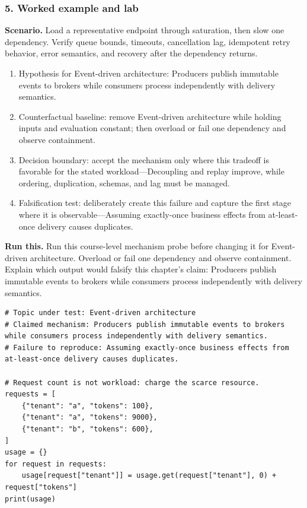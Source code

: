 \subsubsection*{5. Worked example and lab}
\textbf{Scenario.} Load a representative endpoint through saturation, then slow one dependency. Verify queue bounds, timeouts, cancellation lag, idempotent retry behavior, error semantics, and recovery after the dependency returns.
\begin{enumerate}
\item Hypothesis for Event-driven architecture: Producers publish immutable events to brokers while consumers process independently with delivery semantics.
\item Counterfactual baseline: remove Event-driven architecture while holding inputs and evaluation constant; then overload or fail one dependency and observe containment.
\item Decision boundary: accept the mechanism only where this tradeoff is favorable for the stated workload—Decoupling and replay improve, while ordering, duplication, schemas, and lag must be managed.
\item Falsification test: deliberately create this failure and capture the first stage where it is observable—Assuming exactly-once business effects from at-least-once delivery causes duplicates.
\end{enumerate}
\textbf{Run this.} Run this course-level mechanism probe before changing it for Event-driven architecture. Overload or fail one dependency and observe containment. Explain which output would falsify this chapter's claim: Producers publish immutable events to brokers while consumers process independently with delivery semantics.
\begin{Verbatim}[fontsize=\scriptsize]
# Topic under test: Event-driven architecture
# Claimed mechanism: Producers publish immutable events to brokers while consumers process independently with delivery semantics.
# Failure to reproduce: Assuming exactly-once business effects from at-least-once delivery causes duplicates.

# Request count is not workload: charge the scarce resource.
requests = [
    {"tenant": "a", "tokens": 100},
    {"tenant": "a", "tokens": 9000},
    {"tenant": "b", "tokens": 600},
]
usage = {}
for request in requests:
    usage[request["tenant"]] = usage.get(request["tenant"], 0) + request["tokens"]
print(usage)
\end{Verbatim}
